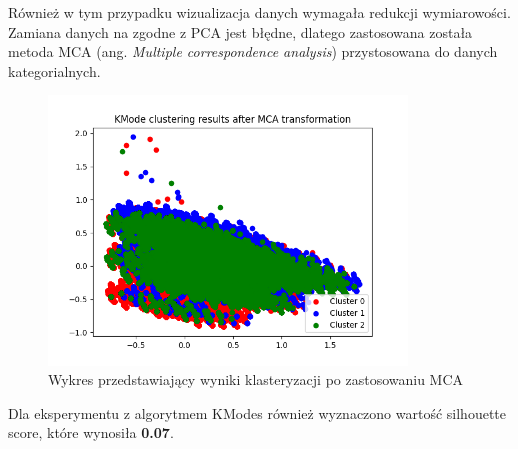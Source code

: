 \documentclass{classrep}
\begin{document}
{{{                Również w tym przypadku wizualizacja danych wymagała redukcji
                wymiarowości. Zamiana danych na zgodne z PCA jest błędne, dlatego
                zastosowana została metoda MCA (ang. \textit{Multiple correspondence
                analysis}) przystosowana do danych kategorialnych.
                
                 \begin{figure}[!htbp]
                    \centering
                    \includegraphics[width=0.85\textwidth]{img/clustering/mca.png}
                    \caption{Wykres przedstawiający wyniki klasteryzacji po zastosowaniu MCA}
                    \label{clust_mca}
                \end{figure}
                \FloatBarrier

                Dla eksperymentu z algorytmem KModes również wyznaczono wartość
                silhouette score, które wynosiła \textbf{0.07}.
                
}}}
\end{document}
